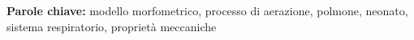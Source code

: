 
\begin{tcolorbox}[arc=0pt, boxrule=0pt, colback=bluePoli!60, width=\textwidth, colupper=white]
  \textbf{Parole chiave:} modello morfometrico, processo di aerazione, polmone, neonato, sistema respiratorio, proprietà meccaniche
\end{tcolorbox}
